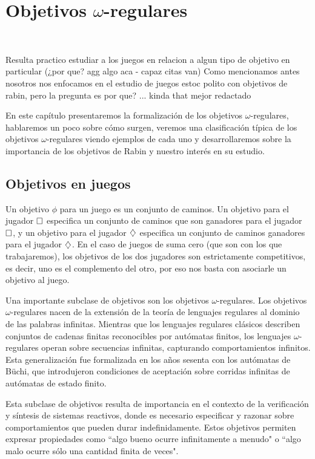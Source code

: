 \chapter{Objetivos $\omega$-regulares}
~\label{cap:objetivos}

Resulta practico estudiar a los juegos en relacion a algun tipo de objetivo en
particular (¿por que? agg algo aca - capaz citas van) Como mencionamos antes
nosotros nos enfocamos en el estudio de juegos estoc polito con objetivos de
rabin, pero la pregunta es por que? ... kinda that mejor redactado

En este capítulo presentaremos la formalización de los objetivos
$\omega$-regulares, hablaremos un poco sobre cómo surgen, veremos una
clasificación típica de los objetivos $\omega$-regulares viendo ejemplos de
cada uno y desarrollaremos sobre la importancia de los objetivos de Rabin y
nuestro interés en su estudio.

\section{Objetivos en juegos}

Un objetivo $\phi$ para un juego es un conjunto de caminos. Un objetivo para el
jugador $\square$ especifica un conjunto de caminos que son ganadores para el
jugador $\square$, y un objetivo para el jugador $\diamondsuit$ especifica un conjunto
de caminos ganadores para el jugador $\diamondsuit$. En el caso de juegos de suma cero
(que son con los que trabajaremos), los objetivos de los dos jugadores son
estrictamente competitivos, es decir, uno es el complemento del otro, por eso
nos basta con asociarle un objetivo al juego.

Una importante subclase de objetivos son los objetivos $\omega$-regulares. Los
objetivos $\omega$-regulares nacen de la extensión de la teoría de lenguajes
regulares al dominio de las palabras infinitas. Mientras que los lenguajes
regulares clásicos describen conjuntos de cadenas finitas reconocibles por
autómatas finitos, los lenguajes $\omega$-regulares operan sobre secuencias
infinitas, capturando comportamientos infinitos. Esta generalización fue
formalizada en los años sesenta con los autómatas de Büchi, que introdujeron
condiciones de aceptación sobre corridas infinitas de autómatas de estado
finito.

Esta subclase de objetivos resulta de importancia en el contexto de la
verificación y síntesis de sistemas reactivos, donde es necesario especificar y
razonar sobre comportamientos que pueden durar indefinidamente. Estos objetivos
permiten expresar propiedades como ``algo bueno ocurre infinitamente a menudo"
o ``algo malo ocurre sólo una cantidad finita de veces".

